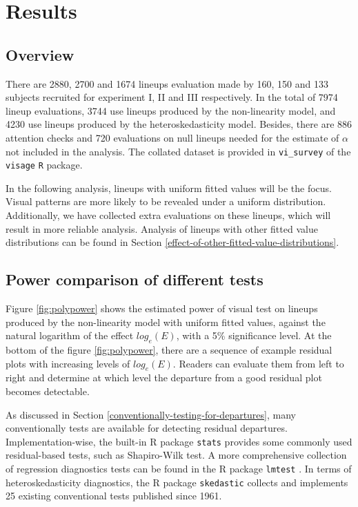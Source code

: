 \documentclass[]{interact}
\theoremstyle{plain}%
\theoremstyle{definition}
\theoremstyle{remark}
\begin{document}
\hypertarget{results}{%
\section{Results}\label{results}}

\hypertarget{overview}{%
\subsection{Overview}\label{overview}}

There are 2880, 2700 and 1674 lineups evaluation made by 160, 150 and
133 subjects recruited for experiment I, II and III respectively. In the
total of 7974 lineup evaluations, 3744 use lineups produced by the
non-linearity model, and 4230 use lineups produced by the
heteroskedasticity model. Besides, there are 886 attention checks and
720 evaluations on null lineups needed for the estimate of \(\alpha\)
not included in the analysis. The collated dataset is provided in
\texttt{vi\_survey} of the \texttt{visage} \texttt{R} package.

In the following analysis, lineups with uniform fitted values will be
the focus. Visual patterns are more likely to be revealed under a
uniform distribution. Additionally, we have collected extra evaluations
on these lineups, which will result in more reliable analysis. Analysis
of lineups with other fitted value distributions can be found in Section
\ref{effect-of-other-fitted-value-distributions}.

\hypertarget{power-comparison-of-different-tests}{%
\subsection{Power comparison of different
tests}\label{power-comparison-of-different-tests}}

Figure \ref{fig:polypower} shows the estimated power of visual test on
lineups produced by the non-linearity model with uniform fitted values,
against the natural logarithm of the effect \(log_e(E)\), with a 5\%
significance level. At the bottom of the figure \ref{fig:polypower},
there are a sequence of example residual plots with increasing levels of
\(log_e(E)\). Readers can evaluate them from left to right and determine
at which level the departure from a good residual plot becomes
detectable.

As discussed in Section \ref{conventionally-testing-for-departures},
many conventionally tests are available for detecting residual
departures. Implementation-wise, the built-in R package \texttt{stats}
provides some commonly used residual-based tests, such as Shapiro-Wilk
test. A more comprehensive collection of regression diagnostics tests
can be found in the R package \texttt{lmtest} \citep{lmtest}. In terms
of heteroskedasticity diagnostics, the R package \texttt{skedastic}
\citep{skedastic} collects and implements 25 existing conventional tests
published since 1961.
\end{document}
